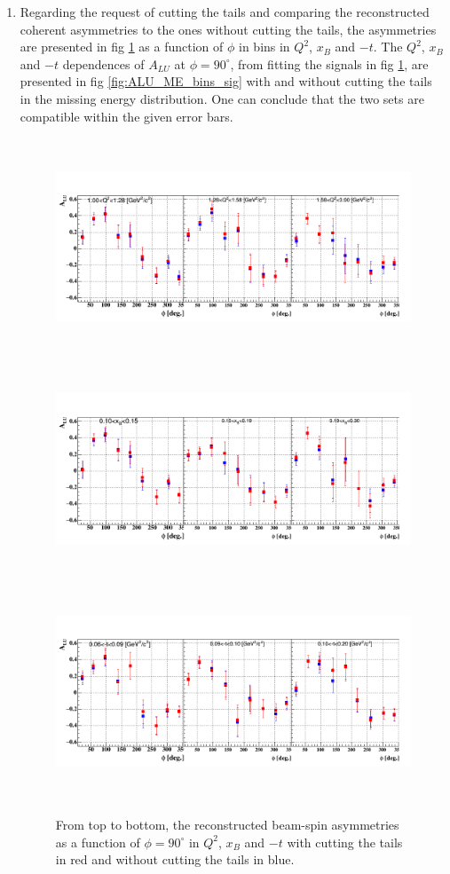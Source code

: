 \begin{enumerate}
\begin{enumerate}
 \item Regarding the request of cutting the tails and comparing the 
reconstructed coherent asymmetries to the ones without cutting the tails, the 
asymmetries are presented in fig \ref{fig:BSA_ME_bins_sig} as a function of 
$\phi$ in bins in $Q^{2}$, $x_{B}$ and $-t$. The $Q^{2}$, $x_{B}$ and $-t$ 
dependences of $A_{LU}$ at $\phi = 90 ^{\circ}$, from fitting the signals in 
fig \ref{fig:BSA_ME_bins_sig}, are presented in fig \ref{fig:ALU_ME_bins_sig} 
with and without cutting the tails in the missing energy distribution. One can 
conclude that the two sets are compatible within the given error bars. 
   
    \begin{figure}[tbp]
     \centering
       \includegraphics[height=6.5cm]{fig_new/BSA_Coh_Comb_Q2_ME.png}
       \includegraphics[height=6.5cm]{fig_new/BSA_Coh_Comb_xB_ME.png}
       \includegraphics[height=6.5cm]{fig_new/BSA_Coh_Comb_t_ME.png}
   \caption{From top to bottom, the reconstructed beam-spin asymmetries as a 
      function of $\phi = 90 ^{\circ}$ in $Q^{2}$,
$x_{B}$ and $-t$ with cutting the tails in red and without cutting the tails in 
blue.  }
   \label{fig:BSA_ME_bins_sig}
    \end{figure}


\end{enumerate}
\end{enumerate}
